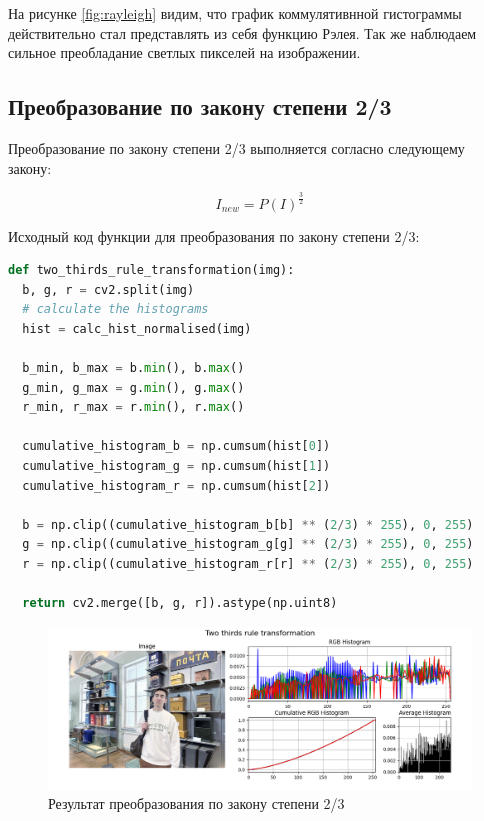 На рисунке \ref{fig:rayleigh} видим, что график коммулятивнной гистограммы действительно стал представлять из себя функцию Рэлея. Так же наблюдаем сильное преобладание светлых пикселей на изображении. 

\subsection{Преобразование по закону степени 2/3}

Преобразование по закону степени 2/3 выполняется согласно следующему закону:

\begin{equation}
  I_{new} = P(I)^{\frac{3}{2}}
\end{equation}

Исходный код функции для преобразования по закону степени 2/3:

\begin{lstlisting}[language=Python]
def two_thirds_rule_transformation(img):
  b, g, r = cv2.split(img)
  # calculate the histograms
  hist = calc_hist_normalised(img)

  b_min, b_max = b.min(), b.max()
  g_min, g_max = g.min(), g.max()
  r_min, r_max = r.min(), r.max()

  cumulative_histogram_b = np.cumsum(hist[0]) 
  cumulative_histogram_g = np.cumsum(hist[1])
  cumulative_histogram_r = np.cumsum(hist[2])

  b = np.clip((cumulative_histogram_b[b] ** (2/3) * 255), 0, 255)
  g = np.clip((cumulative_histogram_g[g] ** (2/3) * 255), 0, 255)
  r = np.clip((cumulative_histogram_r[r] ** (2/3) * 255), 0, 255)
  
  return cv2.merge([b, g, r]).astype(np.uint8)
\end{lstlisting}

\begin{figure}[H]
    \centering
    \includegraphics[width=\textwidth]{../results/Two thirds rule transformation.png}
    \caption{Результат преобразования по закону степени 2/3}
    \label{fig:two_thirds}
\end{figure}

